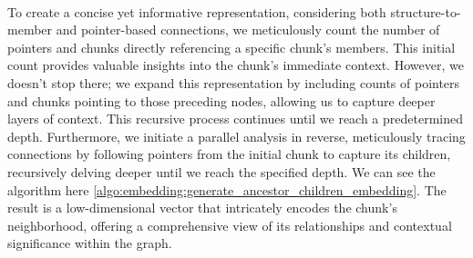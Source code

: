         \paragraph{}To create a concise yet informative representation, considering both structure-to-member and pointer-based connections, we meticulously count the number of \glspl{pointer} and \glspl{chunk} directly referencing a specific \gls{chunk}'s members. This initial count provides valuable insights into the \gls{chunk}'s immediate context. However, we doesn't stop there; we expand this representation by including counts of \glspl{pointer} and \glspl{chunk} pointing to those preceding nodes, allowing us to capture deeper layers of context. This recursive process continues until we reach a predetermined depth. Furthermore, we initiate a parallel analysis in reverse, meticulously tracing connections by following \glspl{pointer} from the initial \gls{chunk} to capture its children, recursively delving deeper until we reach the specified depth. We can see the algorithm here \ref{algo:embedding:generate_ancestor_children_embedding}. The result is a low-dimensional vector that intricately encodes the \gls{chunk}'s neighborhood, offering a comprehensive view of its relationships and contextual significance within the graph.

